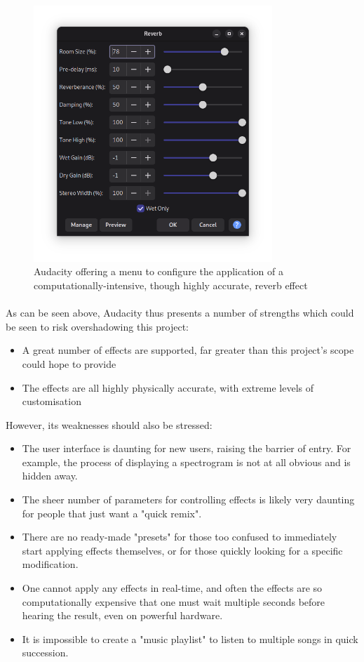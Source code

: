 \begin{figure}[H]
	\caption{Audacity offering a menu to configure the application of a computationally-intensive, though highly accurate, reverb effect}
	\begin{center}
		\includegraphics[width=9cm]{./audacity effects.png}
	\end{center}
\end{figure}

\paragraph{}
As can be seen above, Audacity thus presents a number of strengths which could be seen to risk overshadowing this project:
\begin{itemize}
	\item A great number of effects are supported, far greater than this project's scope could hope to provide
	\item The effects are all highly physically accurate, with extreme levels of customisation
\end{itemize}

However, its weaknesses should also be stressed:
\begin{itemize}
	\item The user interface is daunting for new users, raising the barrier of entry. For example, the process of displaying a spectrogram is not at all obvious and is hidden away.
	\item The sheer number of parameters for controlling effects is likely very daunting for people that just want a "quick remix".
	\item There are no ready-made "presets" for those too confused to immediately start applying effects themselves, or for those quickly looking for a specific modification.
	\item One cannot apply any effects in real-time, and often the effects are so computationally expensive that one must wait multiple seconds before hearing the result, even on powerful hardware.
	\item It is impossible to create a "music playlist" to listen to multiple songs in quick succession.
\end{itemize}

